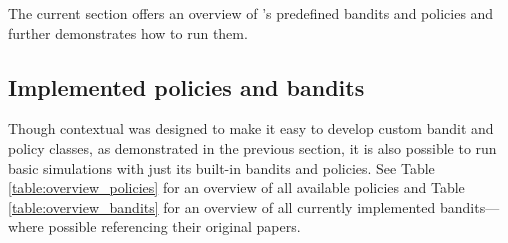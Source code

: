 \documentclass{jss}
\begin{document}
The current section offers an overview of 's predefined bandits and policies and further demonstrates how to run them.

\subsection{Implemented policies and bandits} \label{implbp}

Though contextual was designed to make it easy to develop custom bandit and policy classes, as demonstrated in the previous section, it is also possible to run basic simulations with just its built-in bandits and policies. See Table \ref{table:overview_policies} for an overview of all available policies and Table \ref{table:overview_bandits} for an overview of all currently implemented bandits---where possible referencing their original papers.
\end{document}

